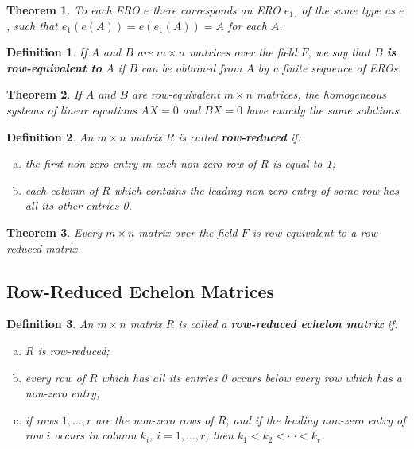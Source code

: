 \documentclass{article}
\newtheorem{theorem}{Theorem}
\newtheorem*{definition*}{Definition}
\begin{document}
\begin{theorem}
  To each ERO $e$ there corresponds an ERO $e_1$, of the same type as $e$, such
  that $e_1(e(A)) = e(e_1(A)) = A$ for each $A$.
\end{theorem}

\begin{definition*}
  If $A$ and $B$ are $m \times n$ matrices over the field $F$, we say that $B$
  \textbf{is row-equivalent to} $A$ if $B$ can be obtained from $A$ by a finite
  sequence of EROs.
\end{definition*}

\begin{theorem}
  If $A$ and $B$ are row-equivalent $m \times n$ matrices, the homogeneous
  systems of linear equations $AX = 0$ and $BX = 0$ have exactly the same
  solutions.
\end{theorem}

\begin{definition*}
  An $m \times n$ matrix $R$ is called \textbf{row-reduced} if:
  \begin{enumerate}[(a)]
    \item the first non-zero entry in each non-zero row of $R$ is equal to 1;
    \item each column of $R$ which contains the leading non-zero entry of some
      row has all its other entries 0.
  \end{enumerate}
\end{definition*}

\begin{theorem} \label{thm:4}
  Every $m \times n$ matrix over the field $F$ is row-equivalent to a
  row-reduced matrix.
\end{theorem}

\subsection{Row-Reduced Echelon Matrices}

\begin{definition*}
  An $m \times n$ matrix $R$ is called a \textbf{row-reduced echelon matrix} if:
  \begin{enumerate}[(a)]
    \item $R$ is row-reduced;
    \item every row of $R$ which has all its entries 0 occurs below every row
      which has a non-zero entry;
    \item if rows $1, \ldots, r$ are the non-zero rows of $R$, and if the
      leading non-zero entry of row $i$ occurs in column $k_i$, $i = 1, \ldots,
      r$, then $k_1 < k_2 < \cdots < k_r$.
  \end{enumerate}
\end{definition*}
\end{document}

